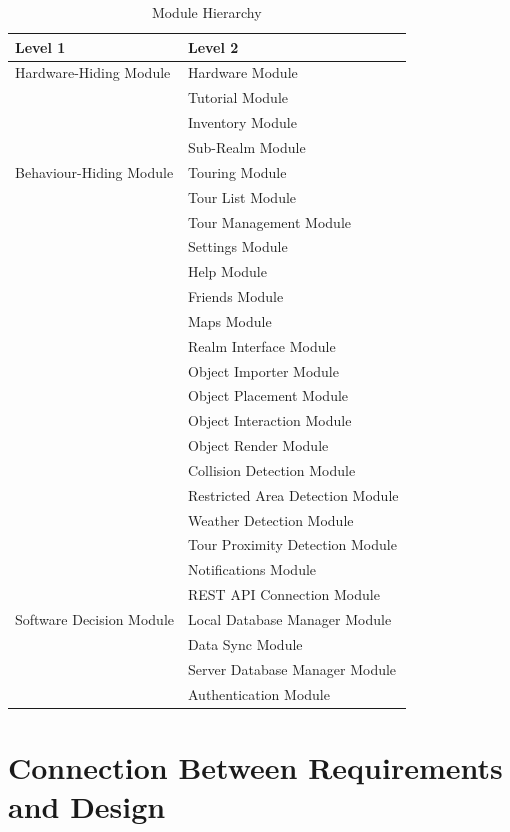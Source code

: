 \documentclass[12pt, titlepage]{article}
\begin{document}
\begin{table}[h!]
\centering
\begin{tabular}{p{} p{}}
\toprule
\textbf{Level 1} & \textbf{Level 2}\\
\midrule

{Hardware-Hiding Module} & Hardware Module\\
\midrule

\multirow{7}{0.3\textwidth}{Behaviour-Hiding Module} & Tutorial Module\\
& Inventory Module\\
& Sub-Realm Module\\
& Touring Module\\
& Tour List Module\\
& Tour Management Module\\
& Settings Module\\
& Help Module\\
& Friends Module\\ 
& Maps Module\\
& Realm Interface Module\\
& Object Importer Module\\
& Object Placement Module\\
& Object Interaction Module\\
& Object Render Module\\
& Collision Detection Module\\
& Restricted Area Detection Module\\
& Weather Detection Module\\
& Tour Proximity Detection Module\\
& Notifications Module\\
\midrule

\multirow{3}{0.3\textwidth}{Software Decision Module} & REST API Connection Module\\
& Local Database Manager Module\\
& Data Sync Module\\
& Server Database Manager Module\\
& Authentication Module\\
\bottomrule

\end{tabular}
\caption{Module Hierarchy}
\label{TblMH}
\end{table}

\newpage

\newpage

\section{Connection Between Requirements and Design} \label{SecConnection}
\end{document}
